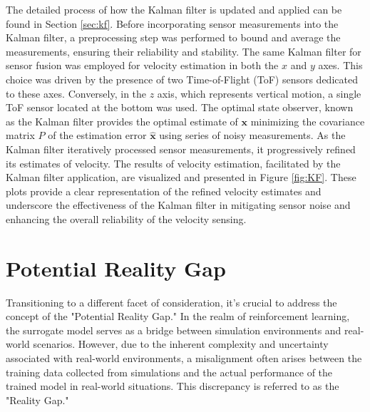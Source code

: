 The detailed process of how the Kalman filter is updated and applied can be found in Section \ref{sec:kf}. Before incorporating sensor measurements into the Kalman filter, a preprocessing step was performed to bound and average the measurements, ensuring their reliability and stability. The same Kalman filter for sensor fusion was employed for velocity estimation in both the $x$ and $y$ axes. This choice was driven by the presence of two Time-of-Flight (ToF) sensors dedicated to these axes. Conversely, in the $z$ axis, which represents vertical motion, a single ToF sensor located at the bottom was used. The optimal state observer, known as the Kalman filter provides the optimal estimate of $\mathbf{x}$ minimizing the covariance matrix $P$ of the estimation error $\hat{\mathbf{x}}$ using series of noisy measurements. As the Kalman filter iteratively processed sensor measurements, it progressively refined its estimates of velocity. The results of velocity estimation, facilitated by the Kalman filter application, are visualized and presented in Figure \ref{fig:KF}. These plots provide a clear representation of the refined velocity estimates and underscore the effectiveness of the Kalman filter in mitigating sensor noise and enhancing the overall reliability of the velocity sensing.

\section{Potential Reality Gap}
Transitioning to a different facet of consideration, it's crucial to address the concept of the "Potential Reality Gap." In the realm of reinforcement learning, the surrogate model serves as a bridge between simulation environments and real-world scenarios. However, due to the inherent complexity and uncertainty associated with real-world environments, a misalignment often arises between the training data collected from simulations and the actual performance of the trained model in real-world situations. This discrepancy is referred to as the "Reality Gap."

